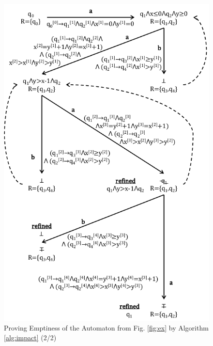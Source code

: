 \documentclass[10pt,conference,letterpaper,twocolumn]{IEEEtran}
\begin{document}
\begin{figure}[htb]
\centerline{\includegraphics[scale=0.65]{IM4.pdf}}
\vspace*{-\baselineskip}
\caption{Proving Emptiness of the Automaton from Fig. \ref{fig:ex}
  by Algorithm \ref{alg:impact} (2/2)}
\label{fig:im2}
\end{figure}
\end{document}
